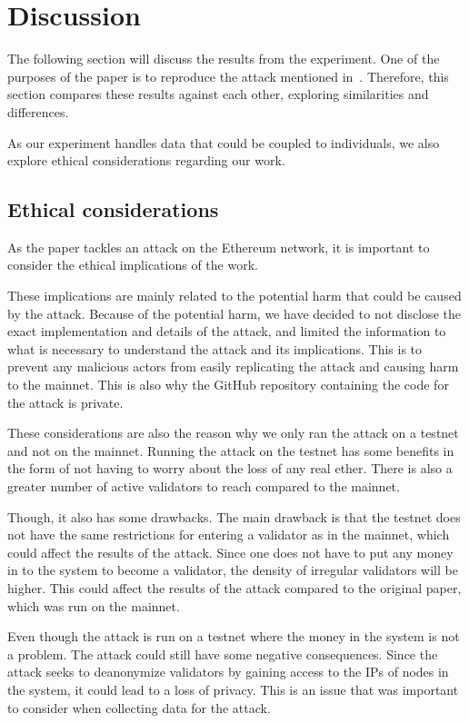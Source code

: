 

\section{Discussion}\label{sec:discussion}
The following section will discuss the results from the experiment.
One of the purposes of the paper is
to reproduce the attack mentioned in~\cite{heimbach2024deanonymizingethereumvalidatorsp2p}.
Therefore, this section compares these results against each other, exploring similarities and differences.


As our experiment handles data that could be coupled to individuals,
we also explore ethical considerations regarding our work.


\subsection{Ethical considerations}\label{subsec:ethical-considerations}
As the paper tackles an attack on the Ethereum network,
it is important to consider the ethical implications of the work.

These implications are mainly related to the potential harm that could be caused by the attack.
Because of the potential harm, we have decided to not disclose the exact implementation and details of the attack,
and limited the information to what is necessary to understand the attack and its implications.
This is to prevent any malicious actors from easily replicating the attack and causing harm to the mainnet.
This is also why the GitHub repository containing the code for the attack is private.

These considerations are also the reason why we only ran the attack on a testnet and not on the mainnet.
Running the attack on the testnet has some benefits in the form
of not having to worry about the loss of any real ether.
There is also a greater number of active validators to reach compared to the mainnet.

Though, it also has some drawbacks.
The main drawback is that the testnet does not have the same restrictions for entering a validator as in the mainnet,
which could affect the results of the attack.
Since one does not have to put any money in to the system to become a validator,
the density of irregular validators will be higher.
This could affect the results of the attack compared to the original paper, which was run on the mainnet.

Even though the attack is run on a testnet where the money in the system is not a problem.
The attack could still have some negative consequences.
Since the attack seeks to deanonymize validators by gaining access to the IPs of nodes in the system, it could lead to a loss of privacy.
This is an issue that was important to consider when collecting data for the attack.

